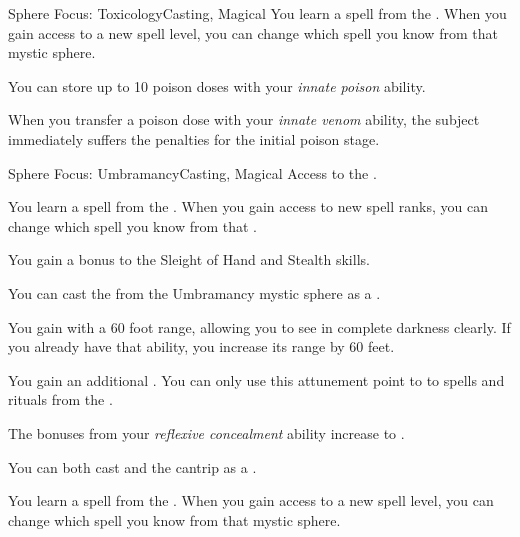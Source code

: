 \begin{feat}{Sphere Focus: Toxicology}{Casting, Magical}
         You learn a spell from the  .
        When you gain access to a new spell level, you can change which spell you know from that mystic sphere.

         You can store up to 10 poison doses with your \textit{innate poison} ability.

         When you transfer a poison dose with your \textit{innate venom} ability, the subject immediately suffers the penalties for the initial poison stage.
    \end{feat}

    \begin{feat}{Sphere Focus: Umbramancy}{Casting, Magical}
        \featpre Access to the  .

         You learn a spell from the  .
        When you gain access to new spell ranks, you can change which spell you know from that .

         You gain a  bonus to the Sleight of Hand and Stealth skills.

         You can cast the   from the Umbramancy mystic sphere as a .

         You gain  with a 60 foot range, allowing you to see in complete darkness clearly.
        If you already have that ability, you increase its range by 60 feet.

         You gain an additional .
        You can only use this attunement point to  to spells and rituals from the  .

         The bonuses from your \textit{reflexive concealment} ability increase to .

         You can both cast and  the  cantrip as a .

         You learn a spell from the  .
        When you gain access to a new spell level, you can change which spell you know from that mystic sphere.


\end{feat}
